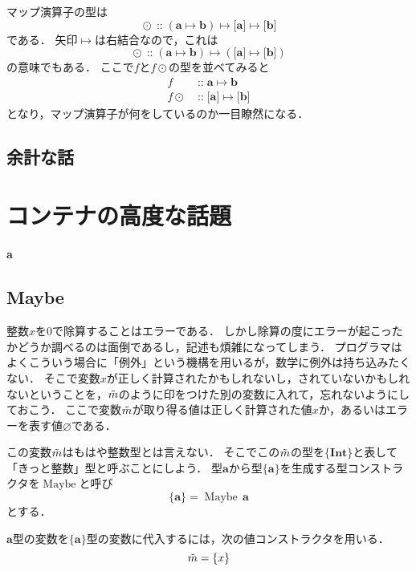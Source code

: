 \documentclass[twocolumn]{jsbook}
\newcommand{\hsklType}[1]{\textbf{#1}}
\newcommand{\hsklTypeConstructor}[1]{\mathop{\mathrm{#1}}}
\DeclareMathOperator{\hsklMap}{\odot}
\DeclareMathOperator{\hsklMaybeConstructor}{\hsklTypeConstructor{Maybe}}
\DeclareMathOperator{\hsklOf}{::}
\newcommand{\hsklInt}{\hsklType{Int}}
\newcommand{\hsklNothing}{\varnothing}
\newcommand{\hsklJust}[1]{\{#1\}}
\newcommand{\hsklListType}[1]{\boldsymbol{[}#1\boldsymbol{]}}
\newcommand{\hsklMaybe}[1]{\Tilde{#1}}
\newcommand{\hsklMaybeType}[1]{\boldsymbol{\{}#1\boldsymbol{\}}}
\newcommand{\hsklTypeConstruct}[2]{#1\,#2}
\DeclareMathOperator{\mathIn}{::}
\DeclareMathOperator{\mathMapsTo}{\mapsto}
\newcommand{\mathMorph}[2]{#1\mathMapsTo#2}
\newcommand{\mathMorphII}[3]{#1\mathMapsTo#2\mathMapsTo#3}
\newenvironment{leader}{\begingroup\bf}{\endgroup}
\begin{document}
マップ演算子の型は
$$\hsklMap\hsklOf{}\mathMorphII{(\mathMorph{\hsklType{a}}{\hsklType{b}})}{\hsklListType{\hsklType{a}}}{\hsklListType{\hsklType{b}}}$$
である．
矢印$\mathMapsTo$は右結合なので，これは$$\hsklMap\hsklOf{}\mathMorph{(\mathMorph{\hsklType{a}}{\hsklType{b}})}{(\mathMorph{\hsklListType{\hsklType{a}}}{\hsklListType{\hsklType{b}}})}$$の意味でもある．
ここで$f$と$f\hsklMap$の型を並べてみると
\begin{align*}
f&\mathIn\mathMorph{\hsklType{a}}{\hsklType{b}}\\
f\hsklMap&\mathIn\mathMorph{\hsklListType{\hsklType{a}}}{\hsklListType{\hsklType{b}}}
\end{align*}
となり，マップ演算子が何をしているのか一目瞭然になる．

\section*{余計な話}

\chapter{コンテナの高度な話題}

\begin{leader}
a
\end{leader}


\section{Maybe}

整数$x$を$0$で除算することはエラーである．
しかし除算の度にエラーが起こったかどうか調べるのは面倒であるし，記述も煩雑になってしまう．
プログラマはよくこういう場合に「例外」という機構を用いるが，数学に例外は持ち込みたくない．
そこで変数$x$が正しく計算されたかもしれないし，されていないかもしれないということを，$\hsklMaybe{m}$のように印をつけた別の変数に入れて，忘れないようにしておこう．
ここで変数$\hsklMaybe{m}$が取り得る値は正しく計算された値$x$か，あるいはエラーを表す値$\hsklNothing$である．

この変数$\hsklMaybe{m}$はもはや整数型とは言えない．
そこでこの$\hsklMaybe{m}$の型を$\hsklMaybeType{\hsklInt}$と表して「きっと整数」型と呼ぶことにしよう．
型$\hsklType{a}$から型$\hsklMaybeType{\hsklType{a}}$を生成する型コンストラクタを$\hsklMaybeConstructor$と呼び$$\hsklMaybeType{\hsklType{a}}=\hsklTypeConstruct{\hsklMaybeConstructor}{\hsklType{a}}$$とする．

$\hsklType{a}$型の変数を$\hsklMaybeType{\hsklType{a}}$型の変数に代入するには，次の値コンストラクタを用いる．
$$\hsklMaybe{m}=\hsklJust{x}$$
\end{document}
